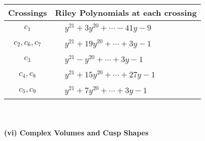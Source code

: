 \documentclass[1p]{elsarticle_modified}
\theoremstyle{definition}
\begin{document}
\begin{tabular}{m{50pt}|m{274pt}}
Crossings & \hspace{64pt}Riley Polynomials at each crossing \\
\hline $$\begin{aligned}c_{1}\end{aligned}$$&$\begin{aligned}
&y^{21}+3 y^{20}+\cdots-41 y-9
\end{aligned}$\\
\hline $$\begin{aligned}c_{2},c_{6},c_{7}\end{aligned}$$&$\begin{aligned}
&y^{21}+19 y^{20}+\cdots+3 y-1
\end{aligned}$\\
\hline $$\begin{aligned}c_{3}\end{aligned}$$&$\begin{aligned}
&y^{21}- y^{20}+\cdots+3 y-1
\end{aligned}$\\
\hline $$\begin{aligned}c_{4},c_{8}\end{aligned}$$&$\begin{aligned}
&y^{21}+15 y^{20}+\cdots+27 y-1
\end{aligned}$\\
\hline $$\begin{aligned}c_{5},c_{9}\end{aligned}$$&$\begin{aligned}
&y^{21}+7 y^{20}+\cdots+3 y-1
\end{aligned}$\\
\hline
\end{tabular}\\~\\
\newpage\flushleft \textbf{(vi) Complex Volumes and Cusp Shapes}
\end{document}
